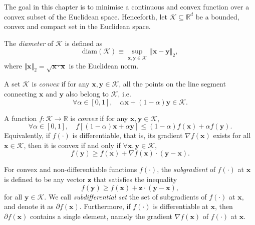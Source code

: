 The goal in this chapter is to minimise a continuous and convex function over a convex subset of the Euclidean space. Henceforth, let $\mathcal{K} \subseteq \mathbb{R}^d$ be a bounded, convex and compact set in the Euclidean space. 
\begin{mydef}
\label{def:diameter}
The \emph{diameter} of $\mathcal{K}$ is defined as
\begin{equation}
\mathrm{diam}(\mathcal{K}) \equiv \sup_{\mathbf{x}, \mathbf{y} \in \mathcal{K}} \, \Vert\mathbf{x} - \mathbf{y}\Vert_2,
\end{equation}
where $\Vert\mathbf{x}\Vert_2 = \sqrt{\mathbf{x}\cdot\mathbf{x}}$ is the Euclidean norm.
\end{mydef}
\begin{mydef}
\label{def:convex-set}
A set $\mathcal{K}$ is \emph{convex} if for any $\mathbf{x}, \mathbf{y} \in \mathcal{K}$, all the points on the line segment connecting $\mathbf{x}$ and $\mathbf{y}$ also belong to $\mathcal{K}$, i.e.\
\begin{equation}
\forall \alpha \in [0, 1], \quad \alpha\mathbf{x} + (1-\alpha)\mathbf{y} \in \mathcal{K}. 
\end{equation}
\end{mydef}
\begin{mydef}
\label{def:convex-function}
A function $f:\mathcal{K} \rightarrow \mathbb{R}$ is \emph{convex} if for any $\mathbf{x}, \mathbf{y} \in \mathcal{K}$,
\begin{equation}
\forall \alpha \in [0, 1], \quad f[(1-\alpha)\mathbf{x} + \alpha\mathbf{y}] \leq (1-\alpha)f(\mathbf{x}) + \alpha f(\mathbf{y}).
\end{equation}
Equivalently, if $f(\cdot)$ is differentiable, that is, its gradient $\nabla f(\mathbf{x})$ exists for all $\mathbf{x} \in \mathcal{K}$, then it is convex if and only if $\forall\mathbf{x}, \mathbf{y} \in \mathcal{K}$,
\begin{equation}
\label{eq:convex-function}
f(\mathbf{y}) \geq f(\mathbf{x}) + \nabla f(\mathbf{x}) \cdot(\mathbf{y} - \mathbf{x}).
\end{equation}
\end{mydef}
\begin{mydef}
\label{def:subgradient}
For convex and non-differentiable functions $f(\cdot)$, the \emph{subgradient} of $f(\cdot)$ at $\mathbf{x}$ is defined to be any vector $\mathbf{z}$ that satisfies the inequality
\begin{equation}
f(\mathbf{y}) \geq f(\mathbf{x}) + \mathbf{z}\cdot(\mathbf{y} - \mathbf{x}),
\end{equation}
for all $\mathbf{y} \in \mathcal{K}$. We call \emph{subdifferential set} the set of subgradients of $f(\cdot)$ at $\mathbf{x}$, and denote it as $\partial f(\mathbf{x})$. Furthermore, if $f(\cdot)$ is differentiable at $\mathbf{x}$, then $\partial f(\mathbf{x})$ contains a single element, namely the gradient $\nabla f(\mathbf{x})$ of $f(\cdot)$ at $\mathbf{x}$.
\end{mydef}

